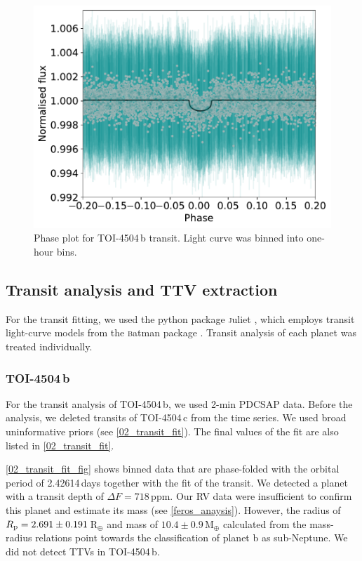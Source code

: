 \documentclass[twocolumn,twocolappendix]{aastex631}
\let\orgautoref\autoref
\renewcommand{\autoref}
        {\def\equationautorefname{Eq.}%
         \def\figureautorefname{Fig.}%
         \def\sectionautorefname{Sect.}%
         \def\subsectionautorefname{Sect.}%
         \def\subsubsectionautorefname{Sect.}%
         \orgautoref}
\begin{document}
\begin{figure}[ht]
  \centering
  \includegraphics[width=1\linewidth]{02_phased.pdf}
  \caption{Phase plot for TOI-4504\,b transit. Light curve was binned into one-hour bins.}
  \label{02_transit_fit_fig}
\end{figure}


\subsection{Transit analysis and TTV extraction}
\label{sec:ttv}

For the transit fitting, we used the python package {\textsc juliet} \citep{juliet}, which employs transit light-curve models from the {\textsc batman} package \citep{batman}. Transit analysis of each planet was treated individually.

\subsubsection{TOI-4504\,b}
\label{sec:4504b}
For the transit analysis of TOI-4504\,b, we used 2-min PDCSAP data. Before the analysis, we deleted transits of TOI-4504\,c from the time series. We used broad uninformative priors (see \autoref{02_transit_fit}). The final values of the fit are also listed in \autoref{02_transit_fit}. 


\autoref{02_transit_fit_fig} shows binned data that are phase-folded with the orbital period of 2.42614\,days together with the fit of the transit. We detected a planet with a transit depth of $\Delta F=718$\,ppm. %
Our RV data were insufficient to confirm this planet and estimate its mass (see \autoref{feros_anaysis}). However, the radius of $R_{\rm p}=2.691 \pm 0.191$\,R$_{\oplus}$ and mass of $10.4 \pm 0.9$\,M$_{\oplus}$ calculated from the mass-radius relations \citep{muller:2024} point towards the classification of planet b as sub-Neptune. We did not detect TTVs in TOI-4504\,b.
\end{document}
